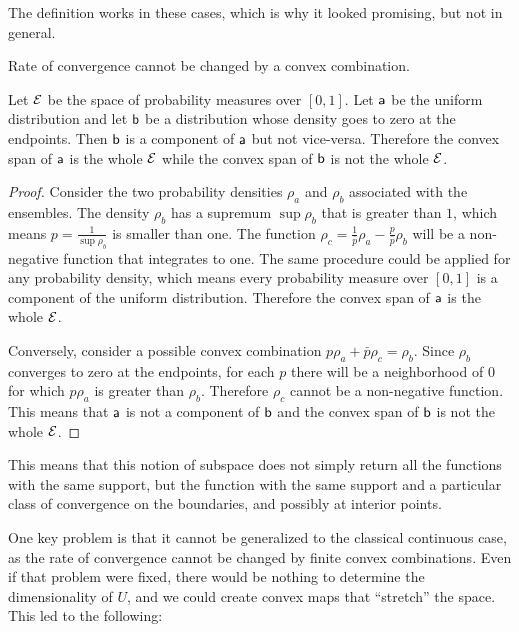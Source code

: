 The definition works in these cases, which is why it looked promising, but not in general.

\begin{insight}
	Rate of convergence cannot be changed by a convex combination.
\end{insight}

\begin{prop}
	Let $\Ens$ be the space of probability measures over $[0,1]$. Let $\ens[a]$ be the uniform distribution and let $\ens[b]$ be a distribution whose density goes to zero at the endpoints. Then $\ens[b]$ is a component of $\ens[a]$ but not vice-versa. Therefore the convex span of $\ens[a]$ is the whole $\Ens$ while the convex span of $\ens[b]$ is not the whole $\Ens$.
\end{prop}

\begin{proof}
	Consider the two probability densities $\rho_a$ and $\rho_b$ associated with the ensembles. The density $\rho_b$ has a supremum $\sup \rho_b$ that is greater than $1$, which means $p = \frac{1}{\sup \rho_b}$ is smaller than one. The function $\rho_c = \frac{1}{\bar{p}} \rho_a - \frac{p}{\bar{p}}\rho_b$ will be a non-negative function that integrates to one. The same procedure could be applied for any probability density, which means every probability measure over $[0,1]$ is a component of the uniform distribution. Therefore the convex span of $\ens[a]$ is the whole $\Ens$.
	
	Conversely, consider a possible convex combination $p \rho_a + \bar{p} \rho_c = \rho_b$. Since $\rho_b$ converges to zero at the endpoints, for each $p$ there will be a neighborhood of $0$ for which $p\rho_a$ is greater than $\rho_b$. Therefore $\rho_c$ cannot be a non-negative function. This means that $\ens[a]$ is not a component of $\ens[b]$ and the convex span of $\ens[b]$ is not the whole $\Ens$.
\end{proof}

This means that this notion of subspace does not simply return all the functions with the same support, but the function with the same support and a particular class of convergence on the boundaries, and possibly at interior points.

One key problem is that it cannot be generalized to the classical continuous case, as the rate of convergence cannot be changed by finite convex combinations. Even if that problem were fixed, there would be nothing to determine the dimensionality of $U$, and we could create convex maps that ``stretch'' the space. This led to the following:

